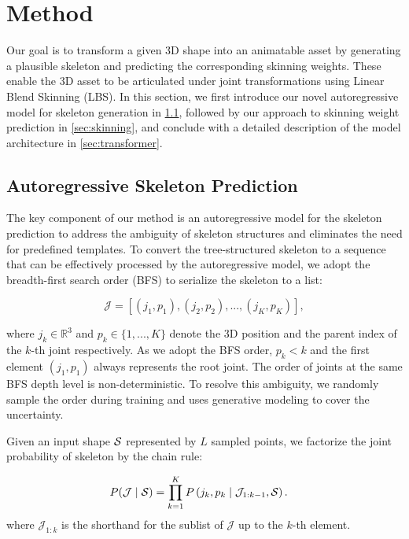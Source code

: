 \section{Method}

Our goal is to transform a given 3D shape into an animatable asset by generating a plausible skeleton and predicting the corresponding skinning weights. These enable the 3D asset to be articulated under joint transformations using Linear Blend Skinning (LBS).
In this section, we first introduce our novel autoregressive model for skeleton generation in \cref{sec:skeleton}, followed by our approach to skinning weight prediction in \cref{sec:skinning}, and conclude with a detailed description of the model architecture in \cref{sec:transformer}.
\subsection{Autoregressive Skeleton Prediction}\label{sec:skeleton}
%
 The key component of our method is an autoregressive model for the skeleton prediction to address the ambiguity of skeleton structures and eliminates the need for predefined templates.
%
To convert the tree-structured skeleton to a sequence that can be effectively processed by the autoregressive model, we adopt the breadth-first search order (BFS) to serialize the skeleton to a list: 

\begin{equation}
    \mathcal{J} = \left[ (j_1, p_1), (j_2, p_2), ..., (j_K, p_K) \right],
\end{equation}

where $j_k \in \mathbb{R}^3$ and $p_k \in \{ 1, ..., K \}$ denote the 3D position and the parent index of the $k$-th joint respectively. As we adopt the BFS order, $p_k<k$ and the first element $(j_1,p_1)$ always represents the root joint. The order of joints at the same BFS depth level is non-deterministic. To resolve this ambiguity, we randomly sample the order during training and uses generative modeling to cover the uncertainty.

Given an input shape $\mathcal{S}$ represented by $L$ sampled points, we factorize the joint probability of skeleton by the chain rule:

\begin{align*}
    P(\mathcal{J} \mid \mathcal{S}) &= \prod_{k=1}^{K} P\left(j_k, p_k \mid \mathcal{J}_{1:k-1}, \mathcal{S}\right).
\end{align*}
where $\mathcal{J}_{1:k}$ is the shorthand for the sublist of $\mathcal{J}$ up to the $k$-th element. 

